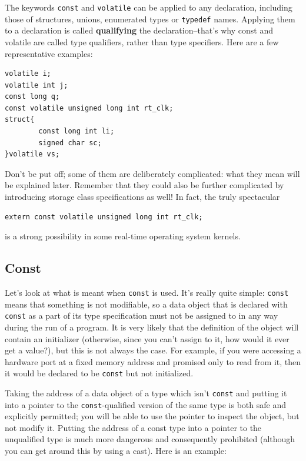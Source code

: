   The keywords \texttt{const} and \texttt{volatile} can be
   applied to any declaration, including those of structures, unions,
   enumerated types or \texttt{typedef} names. Applying them to
   a declaration is called \textbf{qualifying} the declaration--that's
   why const and volatile are called type qualifiers, rather than type
   specifiers. Here are a few representative examples:


\begin{Verbatim}
volatile i;
volatile int j;
const long q;
const volatile unsigned long int rt_clk;
struct{
        const long int li;
        signed char sc;
}volatile vs;
\end{Verbatim}

  Don't be put off; some of them are deliberately complicated: what they
   mean will be explained later. Remember that they could also be further
   complicated by introducing storage class specifications as well! In fact,
   the truly spectacular


\begin{Verbatim}
extern const volatile unsigned long int rt_clk;
\end{Verbatim}

  is a strong possibility in some real-time operating system kernels.


  \subsection{Const}
   

   Let's look at what is meant when \texttt{const} is used. It's
    really quite simple: \texttt{const} means that something is not
    modifiable, so a data object that is declared with \texttt{const} as
    a part of its type specification must not be assigned to in any way
    during the run of a program. It is very likely that the definition of
    the object will contain an initializer (otherwise, since you can't
    assign to it, how would it ever get a value?), but this is not always
    the case. For example, if you were accessing a hardware port at a fixed
    memory address and promised only to read from it, then it would be
    declared to be \texttt{const} but not initialized.


   Taking the address of a data object of a type which isn't
    \texttt{const} and putting it into a pointer to the
    \texttt{const}-qualified version of the same type is both safe and
    explicitly permitted; you will be able to use the pointer to inspect the
    object, but not modify it. Putting the address of a const type into
    a pointer to the unqualified type is much more dangerous and
    consequently prohibited (although you can get around this by using
    a cast). Here is an example:


